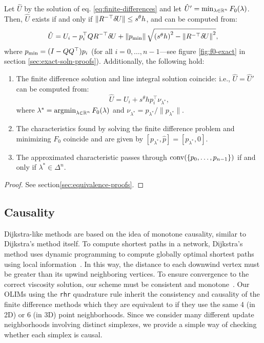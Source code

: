 \documentclass[smallcondensed]{svjour3}
\begin{document}
\begin{theorem}\label{thm:equivalence}
  Let $\hat{U}$ by the solution of eq.\@
  \ref{eq:finite-differences} and let
  $\hat{U}' = \min_{\lambda \in \mathbb{R}^n} F_0(\lambda)$. Then, $\hat{U}$
  exists if and only if $\|R^{-\top} {\delta \hspace{-0.09em} U}\| \leq s^\theta h$, and can
  be computed from:
  \begin{equation}
    \label{eq:U-finite-diff}
    \hat{U} = U_i - p_i^\top Q R^{-\top} {\delta \hspace{-0.09em} U} + \left\|p_{\operatorname{min}}\right\| \sqrt{{(s^\theta h)}^2 - \left\|R^{-\top} {\delta \hspace{-0.09em} U}\right\|^2},
  \end{equation}
  where $p_{\operatorname{min}} = (I - QQ^\top) p_i$ (for all
  $i = 0, \hdots, n - 1$---see figure \ref{fig:f0-exact} in section\@
  \ref{sec:exact-soln-proofs}). Additionally, the following hold:
  \begin{enumerate}
  \item The finite difference solution and line integral solution
    coincide: i.e., $\hat{U} = \hat{U}'$ can be computed from:
    \begin{equation}
      \label{eq:U-from-Ui-exact}
      \hat{U} = U_i + s^\theta h p_i^\top \nu_{\lambda^*},
    \end{equation}
    where $\lambda^* = \operatorname{argmin}_{\lambda \in \mathbb{R}^n} F_0(\lambda)$ and
    $\nu_{\lambda^*} = p_{\lambda^*}/\|p_{\lambda^*}\|$.
  \item The characteristics found by solving the finite difference
    problem and minimizing $F_0$ coincide and are given by
    $[p_{\lambda^*}, \hat{p}] = [p_{\lambda^*}, 0]$.
  \item The approximated characteristic passes through
    $\operatorname{conv}(\left\{p_0, \hdots, p_{n-1}\right\})$ if and only if
    $\lambda^* \in \Delta^n$.
  \end{enumerate}
\end{theorem}

\begin{proof}
  See section\@ \ref{sec:equivalence-proofs}.
\end{proof}

\subsection{Causality}\label{ssec:causality} Dijkstra-like
methods are based on the idea of monotone causality, similar to
Dijkstra's method itself. To compute shortest paths in a network,
Dijkstra's method uses dynamic programming to compute globally optimal
shortest paths using local information~\cite{dijkstra1959note}. In
this way, the distance to each downwind vertex must be greater than
its upwind neighboring vertices. To ensure convergence to the correct
viscosity solution, our scheme must be consistent and
monotone~\cite{crandall1983viscosity}. Our OLIMs using the
\texttt{rhr} quadrature rule inherit the consistency and causality of
the finite difference methods which they are equivalent to if they use
the same 4 (in 2D) or 6 (in 3D) point neighborhoods. Since we consider
many different update neighborhoods involving distinct simplexes, we
provide a simple way of checking whether each simplex is causal.
\end{document}
